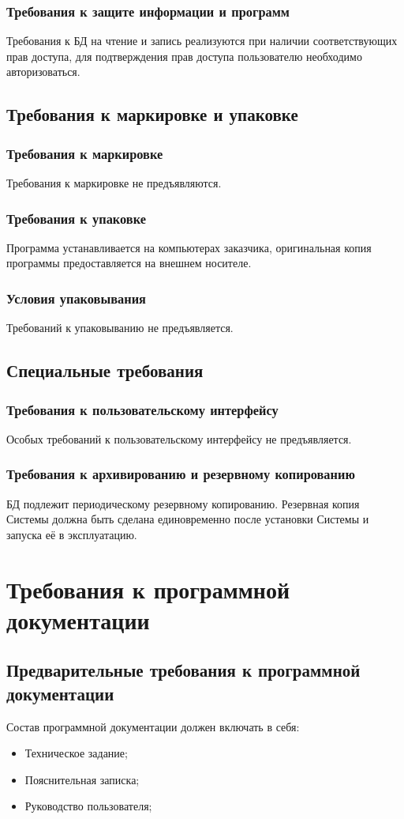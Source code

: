     \subsubsection{Требования к защите информации и программ}
      Требования к БД на чтение и запись реализуются при наличии соответствующих прав доступа, для подтверждения прав доступа пользователю необходимо авторизоваться.
  \subsection{Требования к маркировке и упаковке}
    \subsubsection{Требования к маркировке}
      Требования к маркировке не предъявляются.
    \subsubsection{Требования к упаковке}
      Программа устанавливается на компьютерах заказчика, оригинальная копия программы предоставляется на внешнем носителе.
    \subsubsection{Условия упаковывания}
      Требований к упаковыванию не предъявляется.
  \subsection{Специальные требования}
    \subsubsection{Требования к пользовательскому интерфейсу}
      Особых требований к пользовательскому интерфейсу не предъявляется.
    \subsubsection{Требования к архивированию и резервному копированию}
      БД подлежит периодическому резервному копированию. Резервная копия Системы должна быть сделана единовременно после установки Системы и запуска её в эксплуатацию.
\section{Требования к программной документации}
  \subsection{Предварительные требования к программной документации}
    Состав программной документации должен включать в себя:
    \begin{itemize}
    \item Техническое задание;
    \item Пояснительная записка;
    \item Руководство пользователя;
    \end{itemize}
